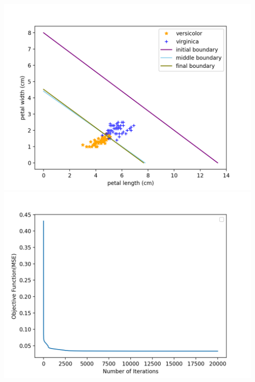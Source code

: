 \documentclass[12pt]{article}
\begin{document}
\begin{center}
    \includegraphics[scale=0.35]{fig/p3c3.png}
    \includegraphics[scale=0.35]{fig/p3c4.png}
\end{center}
\end{document}
